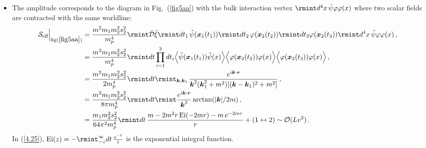 \begin{itemize}
    \item The amplitude corresponds to the diagram in Fig.~(\ref{fig5aa}) with the bulk interaction vertex $\rmint d^4 x \,\Tilde{\psi}\varphi\varphi(x)$ where two scalar fields are contracted with the same worldline:
    \begin{align}
        \begin{split}
\mathcal{S}_{\text{eff}}\Big |_{\text{fig}(\ref{fig5aa})}&=\frac{m^2m_1 m_2^2 s_2^2}{m_{p}^4}\rmint\Bar{\mathcal{D}}\Hat{\xi}\rmint dt_1 \,\Tilde{\psi}(\boldsymbol{x}_1(t_1))\rmint dt_2 \,\varphi(\boldsymbol{x}_2(t_2))\rmint dt_3 \varphi(\boldsymbol{x}_2(t_3))\rmint d^4 x \,\Tilde{\psi}\varphi\varphi(x)\,,\\ &
            =\frac{m^2 m_1 m_2^2 s_2^2}{m_p^4} \rmint dt\prod_{i=1}^3 dt_i \Big\langle\Tilde{\psi}(\boldsymbol{x}_1(t_1))\Tilde{\psi}(x)\Big\rangle \Big\langle\varphi(\boldsymbol{x}_2(t_2))\varphi(x) \Big\rangle\Big\langle\varphi(\boldsymbol{x}_2(t_3))\varphi(x) \Big\rangle\,,\\ &
            =\frac{m^2 m_1 m_2^2 s_2^2}{2m_p^4} \rmint dt \rmint_{\boldsymbol{k},\boldsymbol{k}_1}\,\frac{e^{i\boldsymbol{k}\cdot \boldsymbol{r}}}{\boldsymbol{k}^2(\boldsymbol{k}_1^2+m^2)[(\boldsymbol{k}-\boldsymbol{k}_1)^2+m^2]}\,,\\ &
            =\frac{m^2 m_1 m_2^2 s_2^2}{8\pi m_p^4}\rmint dt \rmint \frac{e^{i\boldsymbol{k}\cdot \boldsymbol{r}}}{\boldsymbol{k}^3}\arctan(|\boldsymbol{k}|/2m)\,,\\&
            =\frac{m_1 m_2^2 s_2^2}{64\pi^2 m_p^4}\rmint dt \,\frac{m-2m^2r\,\text{Ei}(-2mr)-m\,e^{-2mr}}{r}+(1\leftrightarrow 2)\sim\mathcal{O}(Lv^2)\,.
            \label{4.25}
        \end{split}
    \end{align}
    In (\ref{4.25}), $\text{Ei}(z)=-\rmint_{-z}^{\infty}dt\,\frac{e^{-t}}{t}$ is the exponential integral function.

\end{itemize}
